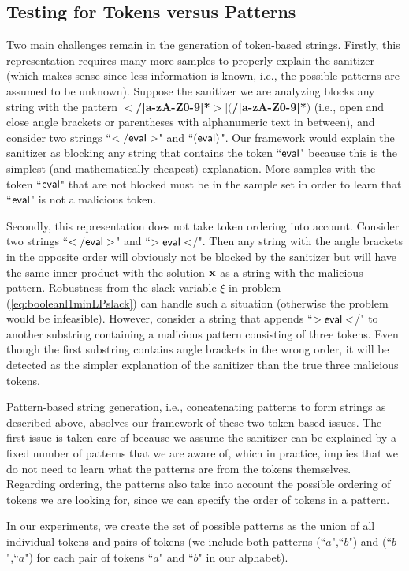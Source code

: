 \subsection{Testing for Tokens versus Patterns}
Two main challenges remain in the generation of token-based strings. Firstly, this representation requires many more samples to properly explain the sanitizer (which makes sense since less information is known, i.e., the possible patterns are assumed to be unknown). Suppose the sanitizer we are analyzing blocks any string with the pattern \textbf{$<$/[a-zA-Z0-9]*$>$$|$$($/[a-zA-Z0-9]*$)$} (i.e., open and close angle brackets or parentheses with alphanumeric text in between), and consider two strings ``$\sf{</eval>}$" and ``$\sf{(eval)}$". Our framework would explain the sanitizer as blocking any string that contains the token ``$\sf{eval}$" because this is the simplest (and mathematically cheapest) explanation. More samples with the token ``$\sf{eval}$" that are not blocked must be in the sample set in order to learn that ``$\sf{eval}$" is not a malicious token.

Secondly, this representation does not take token ordering into account. Consider two strings ``$\sf{</eval>}$" and ``$\sf{>eval<}$/". Then any string with the angle brackets in the opposite order will obviously not be blocked by the sanitizer but will have the same inner product with the solution $\mathbf{x}$ as a string with the malicious pattern. Robustness from the slack variable $\xi$ in problem (\ref{eq:booleanl1minLPslack}) can handle such a situation (otherwise the problem would be infeasible). However, consider a string that appends ``$\sf{>eval<}$/" to another substring containing a malicious pattern consisting of three tokens.  Even though the  first substring contains angle brackets in the wrong order, it will be detected as the simpler explanation of the sanitizer than the true three malicious tokens.

Pattern-based string generation, i.e., concatenating patterns to form strings as described above, absolves our framework of these two token-based issues. The first issue is taken care of because we assume the sanitizer can be explained by a fixed number of patterns that we are aware of, which in practice, implies that we do not need to learn what the patterns are from the tokens themselves. Regarding ordering, the patterns also take into account the possible ordering of tokens we are looking for, since we can specify the order of tokens in a pattern.

In our experiments, we create the set of possible patterns as the union of all individual tokens and pairs of tokens (we include both patterns (``$a$",``$b$") and (``$b$",``$a$") for each pair of tokens ``$a$" and ``$b$" in our alphabet).

